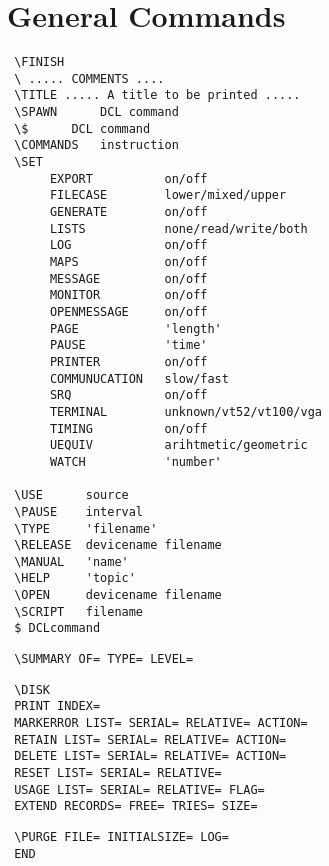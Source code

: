 \documentclass[10pt,a4paper]{report}
\begin{document}
\section{General Commands}


\bigskip{}


\small\begin{verbatim}
 \FINISH
 \ ..... COMMENTS ....
 \TITLE ..... A title to be printed .....
 \SPAWN      DCL command
 \$      DCL command
 \COMMANDS   instruction
 \SET
      EXPORT          on/off
      FILECASE        lower/mixed/upper
      GENERATE        on/off
      LISTS           none/read/write/both
      LOG             on/off
      MAPS            on/off
      MESSAGE         on/off
      MONITOR         on/off
      OPENMESSAGE     on/off
      PAGE            'length'
      PAUSE           'time'
      PRINTER         on/off
      COMMUNUCATION   slow/fast
      SRQ             on/off
      TERMINAL        unknown/vt52/vt100/vga
      TIMING          on/off
      UEQUIV          arihtmetic/geometric
      WATCH           'number'

 \USE      source
 \PAUSE    interval
 \TYPE     'filename'
 \RELEASE  devicename filename
 \MANUAL   'name'
 \HELP     'topic'
 \OPEN     devicename filename
 \SCRIPT   filename
 $ DCLcommand
\end{verbatim}\normalsize




\bigskip{}


\small\begin{verbatim}
 \SUMMARY OF= TYPE= LEVEL=
\end{verbatim}\normalsize




\bigskip{}



\small\begin{verbatim}
 \DISK
 PRINT INDEX=
 MARKERROR LIST= SERIAL= RELATIVE= ACTION=
 RETAIN LIST= SERIAL= RELATIVE= ACTION=
 DELETE LIST= SERIAL= RELATIVE= ACTION=
 RESET LIST= SERIAL= RELATIVE=
 USAGE LIST= SERIAL= RELATIVE= FLAG=
 EXTEND RECORDS= FREE= TRIES= SIZE=
\end{verbatim}\normalsize




\bigskip{}



\small\begin{verbatim}
 \PURGE FILE= INITIALSIZE= LOG=
 END
\end{verbatim}\normalsize
\end{document}

